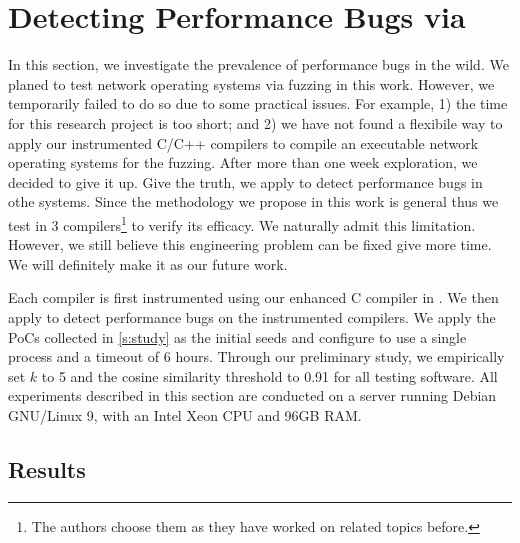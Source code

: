 \section{Detecting Performance Bugs via \sys}
\label{s:eval}
In this section, we investigate the prevalence of performance bugs in the wild.
%
We planed to test network operating systems via fuzzing in this work.
%
However, we temporarily failed to do so due to some practical issues.
%
For example, 1) the time for this research project is too short;
%
and 2) we have not found a flexibile way to apply our instrumented C/C++ compilers to compile an executable network operating systems for the fuzzing.
%
After more than one week exploration, we decided to give it up.
%
Give the truth, we apply \sys to detect performance bugs in othe systems.
%
Since the methodology we propose in this work is general thus we test \sys in 3 compilers\footnote{The authors choose them as they have worked on related topics before.} to verify its efficacy.
%
We naturally admit this limitation.
%
However, we still believe this engineering problem can be fixed give more time.
%
We will definitely make it as our future work.


Each compiler is first instrumented using our enhanced C compiler in \sys.
%
We then apply \sys to detect performance bugs on the instrumented compilers.
%
%
We apply the PoCs collected in \autoref{s:study} as the initial seeds
%
and configure \sys to use a single process and a timeout of 6 hours.
%
Through our preliminary study, we empirically set $k$ to 5 and the cosine similarity threshold to 0.91 for all testing software.
%
All experiments described in this section are conducted on a server running Debian GNU/Linux 9, with an Intel Xeon CPU and 96GB RAM.
%
%
%

%
%
%
%
%
\subsection{Results}

